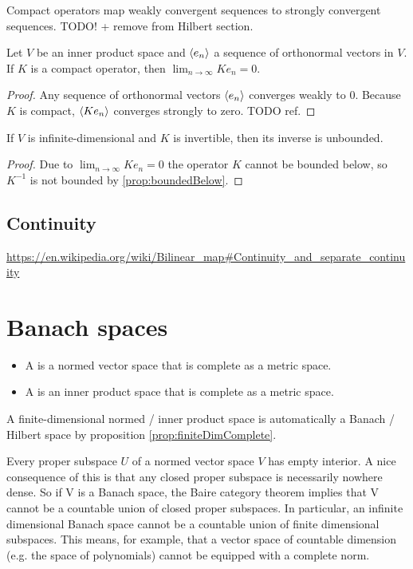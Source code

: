 \begin{proposition}
Compact operators map weakly convergent sequences to strongly convergent sequences. TODO! + remove from Hilbert section.
\end{proposition}
\begin{corollary} \label{corollary:limitCompactImageOrthonormalSequence}
Let $V$ be an inner product space and $\langle e_n \rangle$ a sequence of orthonormal vectors in $V$. If $K$ is a compact operator, then $\lim_{n\to\infty}Ke_n = 0$.
\end{corollary}
\begin{proof}
Any sequence of orthonormal vectors $\langle e_n \rangle$ converges weakly to $0$. Because $K$ is compact, $\langle Ke_n \rangle$ converges strongly to zero. TODO ref.
\end{proof}
\begin{corollary}
If $V$ is infinite-dimensional and $K$ is invertible, then its inverse is unbounded.
\end{corollary}
\begin{proof}
Due to $\lim_{n\to\infty}Ke_n = 0$ the operator $K$ cannot be bounded below, so $K^{-1}$ is not bounded by \ref{prop:boundedBelow}.
\end{proof}

\section{Continuity}
\url{https://en.wikipedia.org/wiki/Bilinear_map#Continuity_and_separate_continuity}


\chapter{Banach spaces}
\begin{definition}
\begin{itemize}
\item A  is a normed vector space that is complete as a metric space.
\item A  is an inner product space that is complete as a metric space.
\end{itemize}
\end{definition}

A finite-dimensional normed / inner product space is automatically a Banach / Hilbert space by proposition \ref{prop:finiteDimComplete}.

Every proper subspace $U$ of a normed vector space $V$ has empty interior.
A nice consequence of this is that any closed proper subspace is necessarily nowhere dense. So if V is a Banach space, the Baire category theorem implies that V cannot be a countable union of closed proper subspaces. In particular, an infinite dimensional Banach space cannot be a countable union of finite dimensional subspaces. This means, for example, that a vector space of countable dimension (e.g. the space of polynomials) cannot be equipped with a complete norm.

